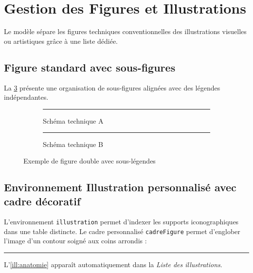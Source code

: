 \section{Gestion des Figures et Illustrations}
\label{sec:illustrations}

Le modèle sépare les figures techniques conventionnelles des illustrations visuelles ou artistiques grâce à une liste dédiée.

\subsection{Figure standard avec sous-figures}
\label{subsec:figures_standards}

La \cref{fig:exemple_figures} présente une organisation de sous-figures alignées avec des légendes indépendantes.

\begin{figure}[htbp]
  \centering
  \begin{subfigure}[b]{0.45\textwidth}
    \centering
    \rule{0.8\textwidth}{3cm}
    \caption{Schéma technique A}
    \label{subfig:schema_a}
  \end{subfigure}
  \hfill
  \begin{subfigure}[b]{0.45\textwidth}
    \centering
    \rule{0.8\textwidth}{3cm}
    \caption{Schéma technique B}
    \label{subfig:schema_b}
  \end{subfigure}
  \caption{Exemple de figure double avec sous-légendes}
  \label{fig:exemple_figures}
\end{figure}

\subsection{Environnement Illustration personnalisé avec cadre décoratif}
\label{subsec:illustrations_dediees}

L'environnement \texttt{illustration} permet d'indexer les supports iconographiques dans une table distincte.
Le cadre personnalisé \texttt{cadreFigure} permet d'englober l'image d'un contour soigné aux coins arrondis :

\begin{illustration}[htbp]
  \centering
  \begin{cadreFigure}[width=0.7\textwidth]
    \rule{7cm}{3.5cm}
  \end{cadreFigure}
  \caption{Représentation anatomique ou graphique d'expérimentation}
  \label{ill:anatomie}
\end{illustration}

L'\cref{ill:anatomie} apparaît automatiquement dans la \emph{Liste des illustrations}.
